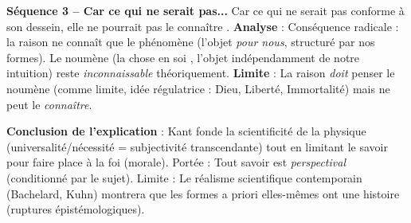 \documentclass[11pt]{article}
\newcommand{\cle}[1]{{\popxbold\color{popdark}#1}}
\begin{document}
\begin{exoresolu}
    \textbf{Séquence 3 -- \guillemotleft Car ce qui ne serait pas... \guillemotright}
    \guillemotleft Car ce qui ne serait pas conforme à son dessein, elle ne pourrait pas le connaître \guillemotright.
    \textbf{Analyse} : Conséquence radicale : la raison ne connaît que le \cle{phénomène} (l'objet \emph{pour nous}, structuré par nos formes). Le \cle{noumène} (la \guillemotleft chose en soi \guillemotright, l'objet indépendamment de notre intuition) reste \emph{inconnaissable} théoriquement. \textbf{Limite} : La raison \emph{doit} penser le noumène (comme limite, idée régulatrice : Dieu, Liberté, Immortalité) mais ne peut le \emph{connaître}.

    \textbf{Conclusion de l'explication} : Kant fonde la \cle{scientificité} de la physique (universalité/nécessité = subjectivité transcendante) tout en \cle{limitant} le savoir pour \guillemotleft faire place à la foi \guillemotright (morale). Portée : Tout savoir est \emph{perspectival} (conditionné par le sujet). Limite : Le \cle{réalisme scientifique} contemporain (Bachelard, Kuhn) montrera que les \guillemotleft formes a priori \guillemotright elles-mêmes ont une histoire (ruptures épistémologiques).
\end{exoresolu}
\end{document}
